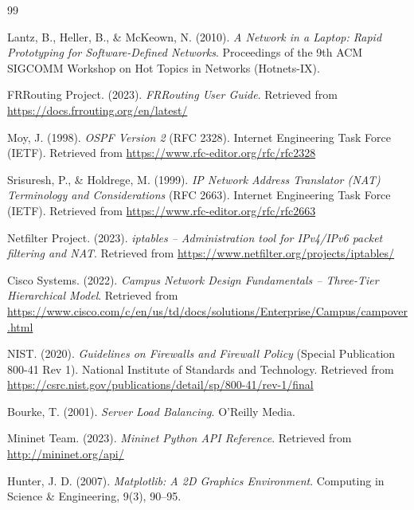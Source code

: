 \begin{thebibliography}{99}

Lantz, B., Heller, B., \& McKeown, N. (2010).
\textit{A Network in a Laptop: Rapid Prototyping for Software-Defined Networks}.
Proceedings of the 9th ACM SIGCOMM Workshop on Hot Topics in Networks (Hotnets-IX).

FRRouting Project. (2023).
\textit{FRRouting User Guide}.
Retrieved from \url{https://docs.frrouting.org/en/latest/}

Moy, J. (1998).
\textit{OSPF Version 2} (RFC 2328).
Internet Engineering Task Force (IETF).
Retrieved from \url{https://www.rfc-editor.org/rfc/rfc2328}

Srisuresh, P., \& Holdrege, M. (1999).
\textit{IP Network Address Translator (NAT) Terminology and Considerations} (RFC 2663).
Internet Engineering Task Force (IETF).
Retrieved from \url{https://www.rfc-editor.org/rfc/rfc2663}

Netfilter Project. (2023).
\textit{iptables -- Administration tool for IPv4/IPv6 packet filtering and NAT}.
Retrieved from \url{https://www.netfilter.org/projects/iptables/}

Cisco Systems. (2022).
\textit{Campus Network Design Fundamentals -- Three-Tier Hierarchical Model}.
Retrieved from \url{https://www.cisco.com/c/en/us/td/docs/solutions/Enterprise/Campus/campover.html}

NIST. (2020).
\textit{Guidelines on Firewalls and Firewall Policy} (Special Publication 800-41 Rev 1).
National Institute of Standards and Technology.
Retrieved from \url{https://csrc.nist.gov/publications/detail/sp/800-41/rev-1/final}

Bourke, T. (2001).
\textit{Server Load Balancing}.
O'Reilly Media.

Mininet Team. (2023).
\textit{Mininet Python API Reference}.
Retrieved from \url{http://mininet.org/api/}

Hunter, J. D. (2007).
\textit{Matplotlib: A 2D Graphics Environment}.
Computing in Science \& Engineering, 9(3), 90--95.

\end{thebibliography}